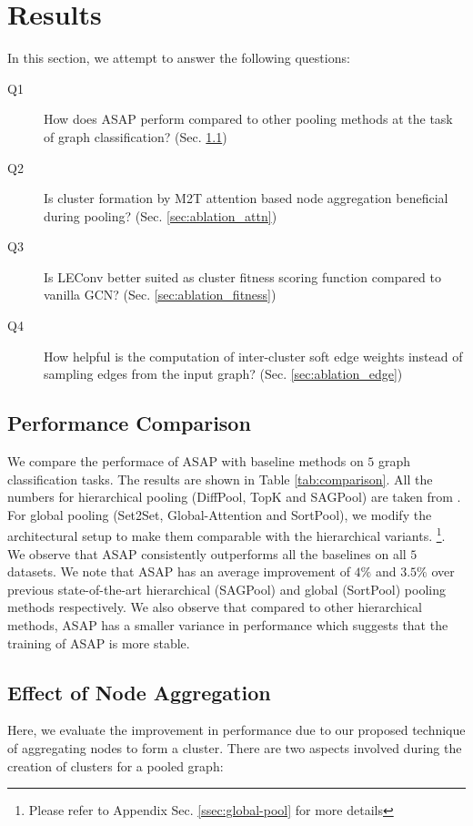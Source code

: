 \documentclass[letterpaper]{article} \usepackage{aaai20}  \usepackage{times}  \usepackage{helvet} \usepackage{courier}  \usepackage[hyphens]{url}  \usepackage{graphicx} \urlstyle{rm} \def\UrlFont{\rm}  \usepackage{graphicx}  \frenchspacing  \setlength{\pdfpagewidth}{8.5in}  \setlength{\pdfpageheight}{11in}
\begin{document}
\section{Results}
In this section, we attempt to answer the following questions:
\begin{description}
	\item[Q1] How does ASAP perform compared to other pooling methods at the task of graph classification? (Sec. \ref{sec:results})
	\item[Q2] Is cluster formation by M2T attention based node aggregation beneficial during pooling? (Sec. \ref{sec:ablation_attn})
	\item[Q3] Is LEConv better suited as cluster fitness scoring function compared to vanilla GCN? (Sec. \ref{sec:ablation_fitness})
	\item[Q4] How helpful is the computation of inter-cluster soft edge weights instead of sampling edges from the input graph? (Sec. \ref{sec:ablation_edge})
\end{description}

\subsection{Performance Comparison}
\label{sec:results}
We compare the performace of ASAP with baseline methods on $5$ graph classification tasks. The results are shown in Table \ref{tab:comparison}. All the numbers for hierarchical pooling (DiffPool, TopK and SAGPool) are taken from \cite{sag}. For global pooling (Set2Set, Global-Attention and SortPool), we modify the architectural setup to make them comparable with the hierarchical variants. \footnote{Please refer to Appendix Sec. \ref{ssec:global-pool} for more details}. We observe that ASAP consistently outperforms all the baselines on all $5$ datasets. We note that ASAP has an average improvement of $4\%$ and $3.5\%$ over previous state-of-the-art hierarchical (SAGPool) and global (SortPool) pooling methods respectively. We also observe that compared to other hierarchical methods, ASAP has a smaller variance in performance which suggests that the training of ASAP is more stable.







\subsection{Effect of Node Aggregation}
\label{sec:ablation_aggr}
Here, we evaluate the improvement in performance due to our proposed technique of aggregating nodes to form a cluster. There are two aspects involved during the creation of clusters for a pooled graph:
\end{document}
